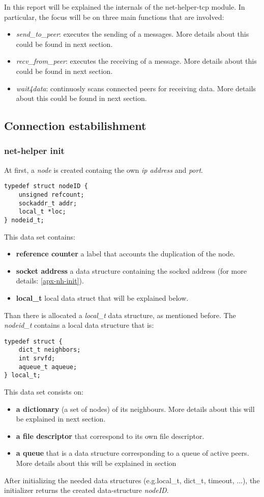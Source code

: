 In this report will be explained the internals of the net-helper-tcp module.
In particular, the focus will be on three main functions that are involved:
\begin{itemize}
  \item \textit{send\_to\_peer}: executes the sending of a messages. More details about
    this could be found in next section.
  \item \textit{recv\_from\_peer}: executes the receiving of a message. More details about
    this could be found in next section.
  \item \textit{wait4data}:  continuosly scans connected peers for receiving data.
    More details about this could be found in next section.
\end{itemize}


\subsection{Connection estabilishment}

\subsubsection{net-helper init}
At first, a \textit{node} is created containg the own \textit{ip address} and \textit{port}. 

\begin{lstlisting}
typedef struct nodeID {
    unsigned refcount;
    sockaddr_t addr;
    local_t *loc;
} nodeid_t;
\end{lstlisting}
This data set contains:
\begin{itemize}
\item \textbf{reference counter} a label that accounts the duplication of the node.
\item \textbf{socket address} a data structure containing the socked address
  (for more details: \ref{apx-nh-init}). 
\item \textbf{local\_t} local data struct that will be explained below.
\end{itemize}
Than there is allocated a \textit{local\_t} data structure, as mentioned before. The \textit{nodeid\_t}
contains a local data structure that is:
\begin{lstlisting}
typedef struct {
    dict_t neighbors;
    int srvfd;
    aqueue_t aqueue;
} local_t;
\end{lstlisting}
This data set consists on:
\begin{itemize}
\item \textbf{a dictionary} (a set of nodes) of its neighbours. More details about this will be explained in next
                            section.
\item \textbf{a file descriptor} that correspond to its own file descriptor.
\item \textbf{a queue} that is a data structure corresponding to a queue of active peers. More details about this
                       will be explained in section %
\end{itemize}
After initializing the needed data structures (e.g.local\_t, dict\_t, timeout, ...),
the initializer returns the created data-structure \textit{nodeID}.

